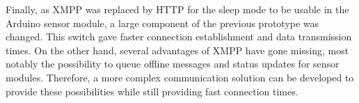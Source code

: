 Finally, as XMPP was replaced by HTTP for the sleep mode to be usable in the Arduino sensor module, a large component of the previous prototype was changed. This switch gave faster connection establishment and data transmission times. On the other hand, several advantages of XMPP have gone missing, most notably the possibility to queue offline messages and status updates for sensor modules. Therefore, a more complex communication solution can be developed to provide these possibilities while still providing fast connection times.


















\ifpdf
    \graphicspath{{8/figures/PNG/}{8/figures/PDF/}{8/figures/}}
\else
    \graphicspath{{8/figures/EPS/}{8/figures/}}
\fi











